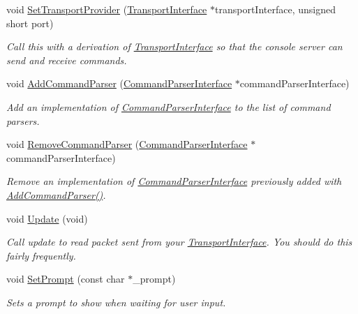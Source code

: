 \begin{DoxyCompactItemize}
\item 
void \hyperlink{class_rak_net_1_1_console_server_ac1238ba7c7120fb15a4858878534b0dd}{Set\-Transport\-Provider} (\hyperlink{class_rak_net_1_1_transport_interface}{Transport\-Interface} $\ast$transport\-Interface, unsigned short port)
\begin{DoxyCompactList}\small\item\em Call this with a derivation of \hyperlink{class_rak_net_1_1_transport_interface}{Transport\-Interface} so that the console server can send and receive commands. \end{DoxyCompactList}\item 
void \hyperlink{class_rak_net_1_1_console_server_a755ea170bf41c054f934297dfe1cc53a}{Add\-Command\-Parser} (\hyperlink{class_rak_net_1_1_command_parser_interface}{Command\-Parser\-Interface} $\ast$command\-Parser\-Interface)
\begin{DoxyCompactList}\small\item\em Add an implementation of \hyperlink{class_rak_net_1_1_command_parser_interface}{Command\-Parser\-Interface} to the list of command parsers. \end{DoxyCompactList}\item 
void \hyperlink{class_rak_net_1_1_console_server_a9f2b0fc23ce507683a96b9ab7276bdc4}{Remove\-Command\-Parser} (\hyperlink{class_rak_net_1_1_command_parser_interface}{Command\-Parser\-Interface} $\ast$command\-Parser\-Interface)
\begin{DoxyCompactList}\small\item\em Remove an implementation of \hyperlink{class_rak_net_1_1_command_parser_interface}{Command\-Parser\-Interface} previously added with \hyperlink{class_rak_net_1_1_console_server_a755ea170bf41c054f934297dfe1cc53a}{Add\-Command\-Parser()}. \end{DoxyCompactList}\item 
\hypertarget{class_rak_net_1_1_console_server_a59a56966e60b3b719cb9f477fc9d0c80}{void \hyperlink{class_rak_net_1_1_console_server_a59a56966e60b3b719cb9f477fc9d0c80}{Update} (void)}\label{class_rak_net_1_1_console_server_a59a56966e60b3b719cb9f477fc9d0c80}

\begin{DoxyCompactList}\small\item\em Call update to read packet sent from your \hyperlink{class_rak_net_1_1_transport_interface}{Transport\-Interface}. You should do this fairly frequently. \end{DoxyCompactList}\item 
void \hyperlink{class_rak_net_1_1_console_server_a284a506fd9eed751651ea6bae77c60b5}{Set\-Prompt} (const char $\ast$\-\_\-prompt)
\begin{DoxyCompactList}\small\item\em Sets a prompt to show when waiting for user input. \end{DoxyCompactList}\end{DoxyCompactItemize}
